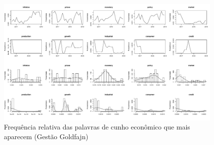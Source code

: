 \begin{landscape}
\begin{figure}
    \centering
    \includegraphics[width=1.5\textwidth]{capitulos/figures/analiserelativagoldfajn.pdf}
    \caption{Frequência relativa das palavras de cunho econômico que mais aparecem (Gestão Goldfajn)}
    \label{fig:analiserelativagoldfajn}
\end{figure}
\end{landscape}
